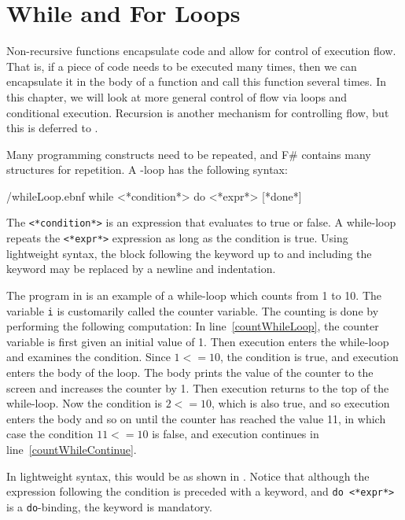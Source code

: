 \documentclass[fsharpNotes.tex]{subfiles}
\begin{document}
\chapter{While and For Loops}
\label{chap:flow}
Non-recursive functions encapsulate code and allow for control of execution flow. That is, if a piece of code needs to be executed many times, then we can encapsulate it in the body of a function and call this function several times. In this chapter, we will look at more general control of flow via loops and conditional execution. Recursion is another mechanism for controlling flow, but this is deferred to .

Many programming constructs need to be repeated, and F\# contains many structures for repetition. A -loop has the following syntax:
%
\begin{verbatimwrite}{\ebnf/whileLoop.ebnf}
while <*condition*> do <*expr*> [*done*]
\end{verbatimwrite}
%
The  \lstinline[language=syntax]{<*condition*>} is an expression that evaluates to true or false. A while-loop repeats the \lstinline[language=syntax]{<*expr*>} expression as long as the condition is true.  Using lightweight syntax, the block following the  keyword up to and including the  keyword may be replaced by a newline and indentation.

The program in  is an example of a while-loop which counts from 1 to 10.
%
%
The variable \lstinline{i} is customarily called the counter variable. The counting is done by performing the following computation: In line~\ref{countWhileLoop}, the counter variable is first given an initial value of 1. Then execution enters the while-loop and examines the condition. Since $1 <= 10$, the condition is true, and execution enters the body of the loop. The body prints the value of the counter to the screen and increases the counter by 1. Then execution returns to the top of the while-loop. Now the condition is $2 <= 10$, which is also true, and so execution enters the body and so on until the counter has reached the value 11, in which case the condition $11 <= 10$ is false, and execution continues in line~\ref{countWhileContinue}.

In lightweight syntax, this would be as shown in .
%
%
Notice that although the expression following the condition is preceded with a  keyword, and \lstinline[language=syntax]{do <*expr*>} is a \lstinline{do}-binding, the keyword  is mandatory. 
\end{document}
